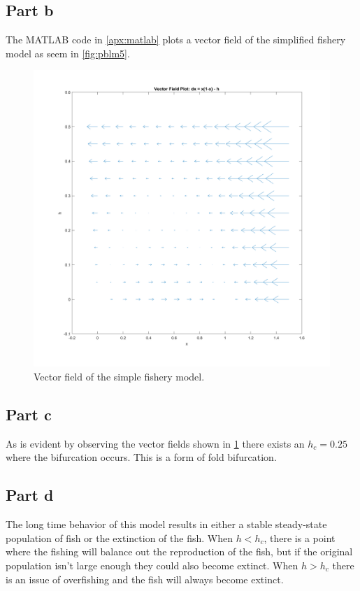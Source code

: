 \documentclass[letter]{article}
\begin{document}
\newpage
\subsection{Part b}

The MATLAB code in \appendixname \ref{apx:matlab} plots a vector field of the simplified fishery model as seem in \figurename \ref{fig:pblm5}.

\begin{figure}[h]
	\centering
	\includegraphics[width=0.7\linewidth]{fig/pblm2}
	\caption{Vector field of the simple fishery model.}
	\label{fig:pblm2}
\end{figure}

\subsection{Part c}
As is evident by observing the vector fields shown in \ref{fig:pblm2} there exists an $h_c = 0.25$ where the bifurcation occurs. This is a form of fold bifurcation.

\subsection{Part d}
The long time behavior of this model results in either a stable steady-state population of fish or the extinction of the fish. When $h<h_c$, there is a point where the fishing will balance out the reproduction of the fish, but if the original population isn't large enough they could also become extinct. When $h>h_c$ there is an issue of overfishing and the fish will always become extinct.


\newpage
\end{document}
